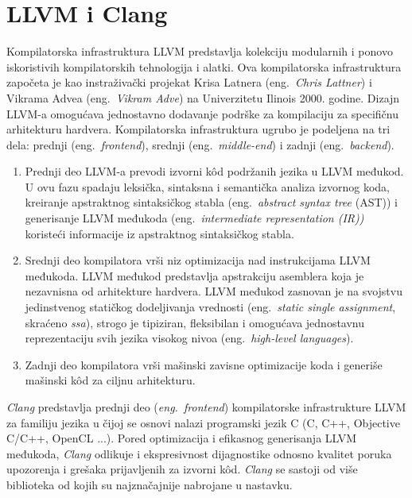 \documentclass[12pt,oneside]{memoir}
\begin{document}
\section{LLVM i Clang}

Kompilatorska infrastruktura LLVM predstavlja kolekciju modularnih i ponovo iskoristivih kompilatorskih tehnologija i alatki.
Ova kompilatorska infrastruktura zapo\v{c}eta je kao instraživački projekat Krisa Latnera (eng.~\textit{Chris Lattner}) i Vikrama Advea (eng.~\textit{Vikram Adve}) na Univerzitetu Ilinois 2000. godine.
Dizajn LLVM-a omogu\'{c}ava jednostavno dodavanje podr\v{s}ke za kompilaciju za specifi\v{c}nu arhitekturu hardvera. Kompilatorska infrastruktura
ugrubo je podeljena na tri dela: prednji (eng.~\textit{frontend}), srednji (eng.~\textit{middle-end}) i zadnji (eng.~\textit{backend}). 

\begin{enumerate}
  \item Prednji deo LLVM-a prevodi izvorni k\^od podr\v{z}anih jezika u LLVM međukod. U ovu fazu spadaju leksi\v{c}ka, sintaksna i semanti\v{c}ka analiza
  izvornog koda, kreiranje apstraktnog sintaksi\v{c}kog stabla (eng.~\textit{abstract syntax tree} (AST)) i generisanje LLVM međukoda (eng.~\textit{intermediate representation (IR))} koriste\'{c}i informacije iz apstraktnog sintaksi\v{c}kog stabla.
  \item{Srednji deo kompilatora vr\v{s}i niz optimizacija nad instrukcijama LLVM međukoda. LLVM međukod predstavlja apstrakciju asemblera koja je nezavnisna od arhitekture hardvera. LLVM međukod zasnovan je na svojstvu jedinstvenog stati\v{c}kog dodeljivanja vrednosti (eng.~\textit{static single assignment}, skra\'{c}eno \textit{ssa}), strogo je tipiziran, fleksibilan i omogu\'{c}ava jednostavnu reprezentaciju svih jezika visokog nivoa (eng.~\textit{high-level languages}).}
  \item{Zadnji deo kompilatora vr\v{s}i ma\v{s}inski zavisne optimizacije koda i generi\v{s}e ma\v{s}inski k\^{o}d za ciljnu arhitekturu.}
\end{enumerate}



\textit{Clang} predstavlja prednji deo (\textit{eng.~frontend}) kompilatorske infrastrukture LLVM za familiju jezika u \v{c}ijoj se osnovi nalazi programski jezik C (C, C++, Objective C/C++, OpenCL ...). Pored optimizacija i efikasnog generisanja LLVM međukoda, \textit{Clang} odlikuje i ekspresivnost dijagnostike odnosno kvalitet poruka upozorenja i grešaka prijavljenih za izvorni k\^{o}d. \textit{Clang} se sastoji od vi\v{s}e biblioteka od kojih su najznačajnije nabrojane u nastavku.
\end{document}
